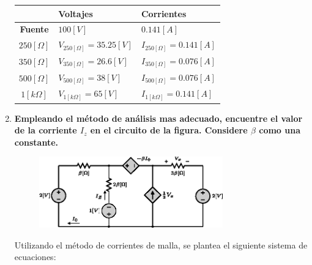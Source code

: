 \documentclass[letter,11pt]{article}
\begin{document}
\begin{enumerate}
\begin{center}
\begin{tabular}{|c|
    >{\centering}m{4.04cm}<{\centering}|
    >{\centering}m{4.04cm}<{\centering}|}
    \hline
    & 
    \textbf{Voltajes} &
    \textbf{Corrientes} \tabularnewline \hline
    \textbf{Fuente} & $100[V]$ & $0.141[A]$ \tabularnewline \hline
    $250[\Omega]$ & $V_{250[\Omega]} = 35.25[V]$ & $I_{250[\Omega]} = 0.141[A]$ \tabularnewline \hline
    $350[\Omega]$ & $V_{350[\Omega]} = 26.6[V]$ & $I_{350[\Omega]} = 0.076[A]$ \tabularnewline \hline
    $500[\Omega]$ & $V_{500[\Omega]} = 38[V]$ & $I_{500[\Omega]} = 0.076[A]$ \tabularnewline \hline
    $ 1[k\Omega]$ & $V_{ 1[k\Omega]} = 65[V]$ & $I_{ 1[k\Omega]} = 0.141[A]$ \tabularnewline \hline
\end{tabular}
\end{center}

\item \textbf{Empleando el método de análisis mas adecuado, encuentre el valor
de la corriente $I_z$ en el circuito de la figura. Considere $\beta$ como una
constante.}\\

\begin{figure}[!h]
\centering
\includegraphics[width=0.75\textwidth]{resources/figura1.eps}
\end{figure}

Utilizando el método de corrientes de malla, se plantea el siguiente sistema de
ecuaciones:


\end{enumerate}
\end{document}
